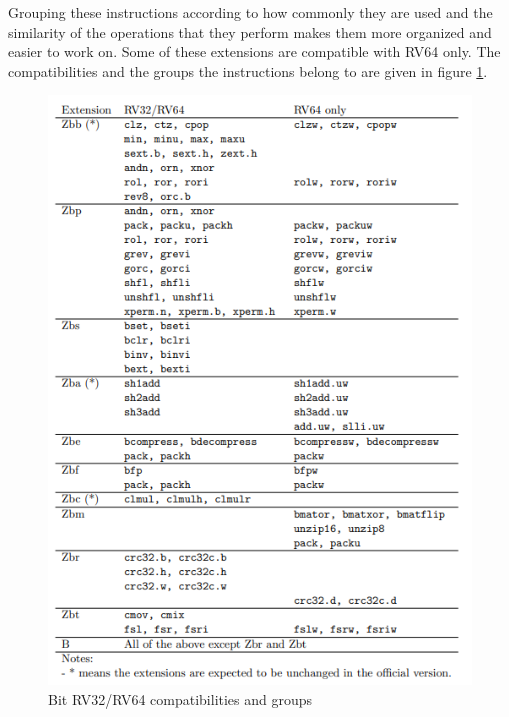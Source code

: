 Grouping these instructions according to how commonly they are used and the similarity of the operations that they perform makes them more organized and easier to work on. 
Some of these extensions are compatible with RV64 only. The compatibilities and the groups the instructions belong to are given in figure \ref{fig:rv32_rv64_compatibilities_and_groups}.
\begin{figure}[h!]
    \centering
    \includegraphics{riscv/rv32_rv64_compatibilities_and_groups.png}
    \caption{Bit RV32/RV64 compatibilities and groups \cite{bitmanipdraft}}
    \label{fig:rv32_rv64_compatibilities_and_groups}
\end{figure}

\clearpage

